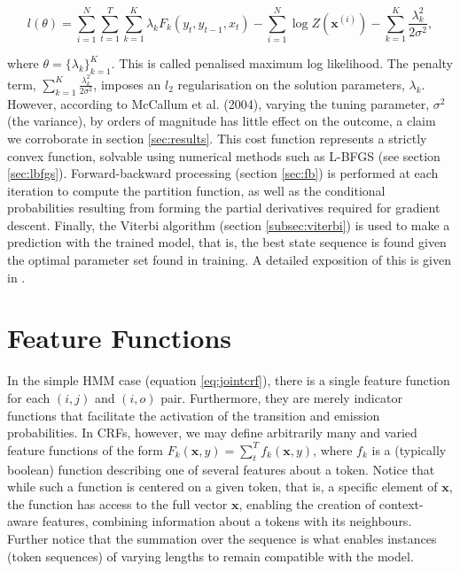 \begin{equation}
l(\theta) = \sum_{i=1}^N\sum_{t=1}^T\sum_{k=1}^K\lambda_kF_{k}(y_t, y_{t-1}, x_t) - \sum_{i=1}^N\log Z(\mathbf{x}^{(i)}) - \sum_{k=1}^K \frac{\lambda_k^2}{2\sigma^2},
\end{equation}

where $\theta = \{\lambda_k\}_{k=1}^K$. This is called penalised maximum log likelihood. The penalty term, $\sum_{k=1}^K\frac{\lambda_k^2}{2\sigma^2}$, imposes an $l_2$ regularisation on the solution parameters, $\lambda_k$. However, according to McCallum et al. (2004), varying the tuning parameter, $\sigma^2$ (the variance), by orders of magnitude has little effect on the outcome\cite{mccallum}, a claim we corroborate in section \ref{sec:results}. This cost function represents a strictly convex function, solvable using numerical methods such as L-BFGS (see section \ref{sec:lbfgs}). Forward-backward processing (section \ref{sec:fb}) is performed at each iteration to compute the partition function, as well as the conditional probabilities resulting from forming the partial derivatives required for gradient descent. Finally, the Viterbi algorithm (section \ref{subsec:viterbi}) is used to make a prediction with the trained model, that is, the best state sequence is found given the optimal parameter set found in training. A detailed exposition of this is given in \cite{Mccallum}.

\section{Feature Functions}
\label{sec:featurefunctions}

In the simple HMM case (equation \ref{eq:jointcrf}), there is a single feature function for each $(i, j)$ and $(i, o)$ pair. Furthermore, they are merely indicator functions that facilitate the activation of the transition and emission probabilities. In CRFs, however, we may define arbitrarily many and varied feature functions of the form $F_k(\mathbf{x}, y) = \sum_t^T f_k(\mathbf{x}, y)$, where $f_k$ is a (typically boolean) function describing one of several features about a token. Notice that while such a function is centered on a given token, that is, a specific element of $\mathbf{x}$, the function has access to the full vector $\mathbf{x}$, enabling the creation of context-aware features, combining information about a tokens with its neighbours. Further notice that the summation over the sequence is what enables instances (token sequences) of varying lengths to remain compatible with the model.

